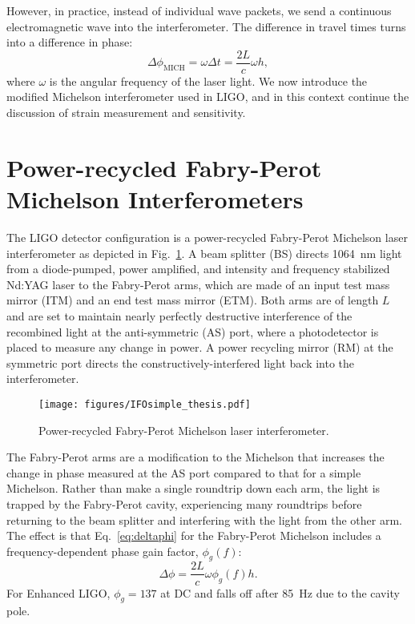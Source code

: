 However, in practice, instead of individual wave packets, we send a
continuous electromagnetic wave into the interferometer. The
difference in travel times turns into a difference in phase:
\begin{equation}
\Delta \phi_{\mathrm{MICH}} = \omega \Delta t = \frac{2 L}{c} \omega h,
\label{eq:deltaphi}
\end{equation}
where $\omega$ is the angular frequency of the laser light. We now
introduce the modified Michelson interferometer used in LIGO, and in
this context continue the discussion of strain measurement and
sensitivity.




\section{Power-recycled Fabry-Perot Michelson Interferometers} 
The LIGO detector configuration is a power-recycled Fabry-Perot
Michelson laser interferometer as depicted in
Fig.~\ref{fig:IFOschematic}. A beam splitter (BS) directs 1064~nm
light from a diode-pumped, power amplified, and intensity and
frequency stabilized Nd:YAG laser to the Fabry-Perot arms, which are
made of an input test mass mirror (ITM) and an end test mass mirror
(ETM). Both arms are of length $L$ and are set to maintain nearly
perfectly destructive interference of the recombined light at the
anti-symmetric (AS) port, where a photodetector is placed to measure
any change in power. A power recycling mirror (RM) at the symmetric
port directs the constructively-interfered light back into the
interferometer.

\begin{figure}
\begin{centering}
\texttt{[image: figures/IFOsimple\_thesis.pdf]}
\caption[Power-recycled Fabry-Perot Michelson laser
interferometer]{Power-recycled Fabry-Perot Michelson laser
  interferometer.}
\label{fig:IFOschematic}
\end{centering}
\end{figure}

The Fabry-Perot arms are a modification to the Michelson that
increases the change in phase measured at the AS port compared to that
for a simple Michelson. Rather than make a single roundtrip down each
arm, the light is trapped by the Fabry-Perot cavity, experiencing many
roundtrips before returning to the beam splitter and interfering with
the light from the other arm. The effect is that Eq.~\ref{eq:deltaphi}
for the Fabry-Perot Michelson includes a frequency-dependent phase
gain factor, $\phi_g(f)$:
\begin{equation}
\Delta \phi = \frac{2 L}{c} \omega \phi_g(f) h.
\label{eq:deltaphi}
\end{equation}
For Enhanced LIGO, $\phi_g = 137$ at DC and falls off after 85~Hz due
to the cavity pole.

